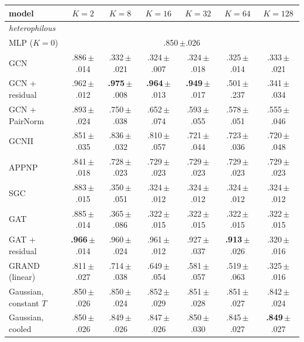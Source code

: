 \begin{tabular}{lcccccc}
\toprule
model & $K=2$ & $K=8$ & $K=16$ & $K=32$ & $K=64$ & $K=128$\\
\midrule
\multicolumn{7}{l}{\emph{heterophilous}}\\
MLP ($K=0$) & \multicolumn{6}{c}{.850\,{\tiny$\pm$.026}}\\
GCN & .886\,{\tiny$\pm$.014} & .332\,{\tiny$\pm$.021} & .324\,{\tiny$\pm$.007} & .324\,{\tiny$\pm$.018} & .325\,{\tiny$\pm$.014} & .333\,{\tiny$\pm$.021}\\
GCN + residual & .962\,{\tiny$\pm$.012} & \textbf{.975}\,{\tiny$\pm$.008} & \textbf{.964}\,{\tiny$\pm$.013} & \textbf{.949}\,{\tiny$\pm$.017} & .501\,{\tiny$\pm$.237} & .341\,{\tiny$\pm$.034}\\
GCN + PairNorm & .893\,{\tiny$\pm$.024} & .750\,{\tiny$\pm$.038} & .652\,{\tiny$\pm$.074} & .593\,{\tiny$\pm$.055} & .578\,{\tiny$\pm$.051} & .555\,{\tiny$\pm$.046}\\
GCNII & .851\,{\tiny$\pm$.035} & .836\,{\tiny$\pm$.032} & .810\,{\tiny$\pm$.057} & .721\,{\tiny$\pm$.044} & .723\,{\tiny$\pm$.036} & .720\,{\tiny$\pm$.048}\\
APPNP & .841\,{\tiny$\pm$.018} & .728\,{\tiny$\pm$.023} & .729\,{\tiny$\pm$.023} & .729\,{\tiny$\pm$.023} & .729\,{\tiny$\pm$.023} & .729\,{\tiny$\pm$.023}\\
SGC & .883\,{\tiny$\pm$.015} & .350\,{\tiny$\pm$.051} & .324\,{\tiny$\pm$.012} & .324\,{\tiny$\pm$.012} & .324\,{\tiny$\pm$.012} & .324\,{\tiny$\pm$.012}\\
GAT & .885\,{\tiny$\pm$.014} & .365\,{\tiny$\pm$.086} & .322\,{\tiny$\pm$.015} & .322\,{\tiny$\pm$.015} & .322\,{\tiny$\pm$.015} & .322\,{\tiny$\pm$.015}\\
GAT + residual & \textbf{.966}\,{\tiny$\pm$.014} & .960\,{\tiny$\pm$.024} & .961\,{\tiny$\pm$.012} & .927\,{\tiny$\pm$.037} & \textbf{.913}\,{\tiny$\pm$.026} & .320\,{\tiny$\pm$.016}\\
GRAND (linear) & .811\,{\tiny$\pm$.027} & .714\,{\tiny$\pm$.038} & .649\,{\tiny$\pm$.054} & .581\,{\tiny$\pm$.057} & .519\,{\tiny$\pm$.063} & .325\,{\tiny$\pm$.016}\\
Gaussian, constant $T$ & .850\,{\tiny$\pm$.026} & .850\,{\tiny$\pm$.024} & .852\,{\tiny$\pm$.029} & .851\,{\tiny$\pm$.028} & .851\,{\tiny$\pm$.027} & .842\,{\tiny$\pm$.024}\\
Gaussian, cooled & .850\,{\tiny$\pm$.026} & .849\,{\tiny$\pm$.026} & .847\,{\tiny$\pm$.026} & .850\,{\tiny$\pm$.030} & .845\,{\tiny$\pm$.027} & \textbf{.849}\,{\tiny$\pm$.027}\\

\end{tabular}
